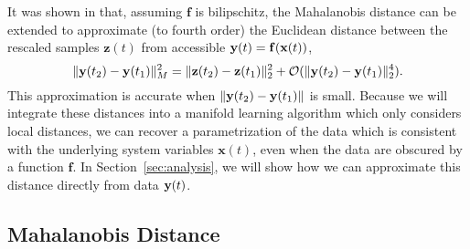 %
It was shown in \cite{singer2008non} that, assuming $\mathbf{f}$ is bilipschitz, the Mahalanobis distance can be extended to approximate (to fourth order) the Euclidean distance between the rescaled samples $\mathbf{z}(t)$ from accessible $\mathbf{y}(t) = \mathbf{f} (\mathbf{x}(t))$,
%
\begin{equation} \label{eq:mahalanobis2}
\| \mathbf{y}(t_2) - \mathbf{y}(t_1) \|^2_M = \| \mathbf{z}(t_2) - \mathbf{z}(t_1) \|^2_2 + \mathcal{O}(\| \mathbf{y}(t_2) - \mathbf{y}(t_1) \|^4_2).
\end{equation}
%
This approximation is accurate when $\| \mathbf{y}(t_2) - \mathbf{y}(t_1) \|$ is small.
%
Because we will integrate these distances into a manifold learning algorithm which only considers local distances, we can recover a parametrization of the data which is consistent with the underlying system variables $\mathbf{x}(t)$, even when the data are obscured by a function $\mathbf{f}$.
%
In Section~\ref{sec:analysis}, we will show how we can approximate this distance directly from data $\mathbf{y}(t)$.
%


\subsection{Mahalanobis Distance}
\label{subsec:mahalanobis}

